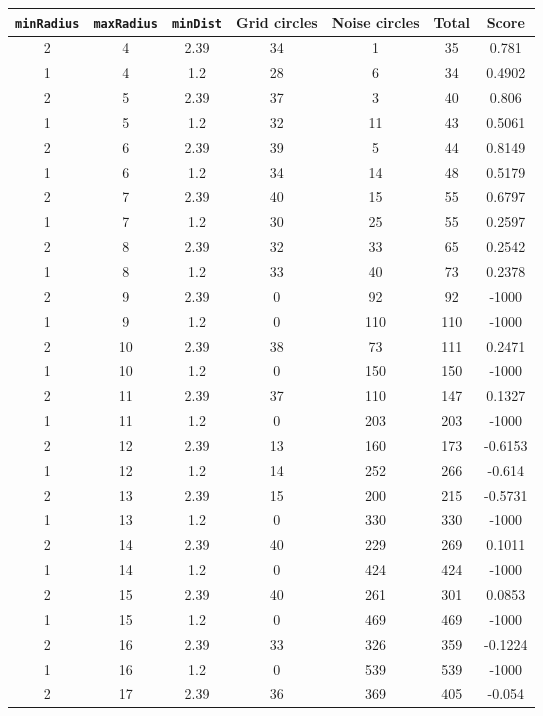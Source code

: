 \documentclass[letterpaper, 12pt]{article}
\begin{document}
\begin{longtable}{|c|c|c|c|c|c|c|}
\hline
\textbf{\texttt{minRadius}} & \textbf{\texttt{maxRadius}} & \textbf{\texttt{minDist}} & \textbf{Grid circles} & \textbf{Noise circles} & \textbf{Total} & \textbf{Score} \\
\hline
2 & 4 & 2.39 & 34 & 1 & 35 & 0.781 \\
\hline
1 & 4 & 1.2 & 28 & 6 & 34 & 0.4902 \\
\hline
2 & 5 & 2.39 & 37 & 3 & 40 & 0.806 \\
\hline
1 & 5 & 1.2 & 32 & 11 & 43 & 0.5061 \\
\hline
2 & 6 & 2.39 & 39 & 5 & 44 & 0.8149 \\
\hline
1 & 6 & 1.2 & 34 & 14 & 48 & 0.5179 \\
\hline
2 & 7 & 2.39 & 40 & 15 & 55 & 0.6797 \\
\hline
1 & 7 & 1.2 & 30 & 25 & 55 & 0.2597 \\
\hline
2 & 8 & 2.39 & 32 & 33 & 65 & 0.2542 \\
\hline
1 & 8 & 1.2 & 33 & 40 & 73 & 0.2378 \\
\hline
2 & 9 & 2.39 & 0 & 92 & 92 & -1000 \\
\hline
1 & 9 & 1.2 & 0 & 110 & 110 & -1000 \\
\hline
2 & 10 & 2.39 & 38 & 73 & 111 & 0.2471 \\
\hline
1 & 10 & 1.2 & 0 & 150 & 150 & -1000 \\
\hline
2 & 11 & 2.39 & 37 & 110 & 147 & 0.1327 \\
\hline
1 & 11 & 1.2 & 0 & 203 & 203 & -1000 \\
\hline
2 & 12 & 2.39 & 13 & 160 & 173 & -0.6153 \\
\hline
1 & 12 & 1.2 & 14 & 252 & 266 & -0.614 \\
\hline
2 & 13 & 2.39 & 15 & 200 & 215 & -0.5731 \\
\hline
1 & 13 & 1.2 & 0 & 330 & 330 & -1000 \\
\hline
2 & 14 & 2.39 & 40 & 229 & 269 & 0.1011 \\
\hline
1 & 14 & 1.2 & 0 & 424 & 424 & -1000 \\
\hline
2 & 15 & 2.39 & 40 & 261 & 301 & 0.0853 \\
\hline
1 & 15 & 1.2 & 0 & 469 & 469 & -1000 \\
\hline
2 & 16 & 2.39 & 33 & 326 & 359 & -0.1224 \\
\hline
1 & 16 & 1.2 & 0 & 539 & 539 & -1000 \\
\hline
2 & 17 & 2.39 & 36 & 369 & 405 & -0.054 \\

\end{longtable}
\end{document}
